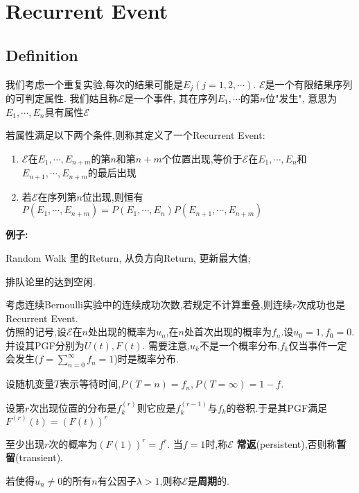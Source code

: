 \section{Recurrent Event}
\subsection{Definition}

我们考虑一个重复实验,每次的结果可能是$E_j (j = 1, 2, \cdots )$.
$\mathcal{E}$是一个有限结果序列的可判定属性.
我们姑且称$\mathcal{E}$是一个事件, 其在序列$E_1, \cdots $的第$n$位"发生",
意思为$E_1, \cdots ,E_n$具有属性$\mathcal{E}$

若属性满足以下两个条件,则称其定义了一个Recurrent Event:
\begin{enumerate}
    \item
      $ \mathcal{E}$在$ E_{1},\cdots,E_{n+m} $的第$ n$和第$ n+m$个位置出现,等价于$ \mathcal{E}$在$ E_{1},\cdots ,E_{n}$和$
      E_{n+1},\cdots ,E_{n+m}$的最后出现

      \item
        若$ \mathcal{E}$在序列第$ n$位出现,则恒有$ P(E_{1},\cdots ,E_{n+m}) = P(E_{1},\cdots ,E_{n})P(E_{n+1},\cdots ,E_{n+m})$
\end{enumerate}

\textbf{例子:}

Random Walk 里的Return, 从负方向Return, 更新最大值;

排队论里的达到空闲.

考虑连续Bernoulli实验中的连续成功次数,若规定不计算重叠,则连续$ r$次成功也是Recurrent Event.
\\

仿照的记号,设$ \mathcal{E}$在$ n$处出现的概率为$ u_n$,在$ n$处首次出现的概率为$ f_n$.设$ u_0 = 1, f_0=0$.并设其PGF分别为$ U(t),F(t)$.
需要注意,$ u_k$不是一个概率分布,$ f_k$仅当事件一定会发生($ f = \sum_{n=0}^\infty f_n = 1$)时是概率分布.

设随机变量$ T$表示等待时间,$ P(T=n) = f_n,P(T=\infty) = 1-f$.

设第$ r$次出现位置的分布是$ f^{(r)}_k$则它应是$ f^{(r-1)}_k与f_k$的卷积.于是其PGF满足 $ F^{(r)}(t) = (F(t))^r$

至少出现$ r$次的概率为$ (F(1))^r = f^r$. 当$ f=1$时,称$ \mathcal{E}$ \textbf{常返}(persistent),否则称\textbf{暂留}(transient).

若使得$ u_n\neq 0$的所有$ n$有公因子$ \lambda >1$,则称$ \mathcal{E}$是\textbf{周期}的.

